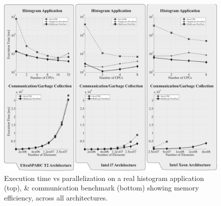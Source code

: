 \documentclass[runningheads,a4paper,fleqn]{llncs}
\begin{document}
\begin{figure}
\centering
\includegraphics[width=\textwidth]{../../benchmarks/graphs/hist-comm}
\caption{Execution time vs parallelization on a real histogram application
(top), \& communication benchmark (bottom) showing memory efficiency, 
across all architectures.}
\label{fig:eval-hist-comm}
\end{figure}
\end{document}
